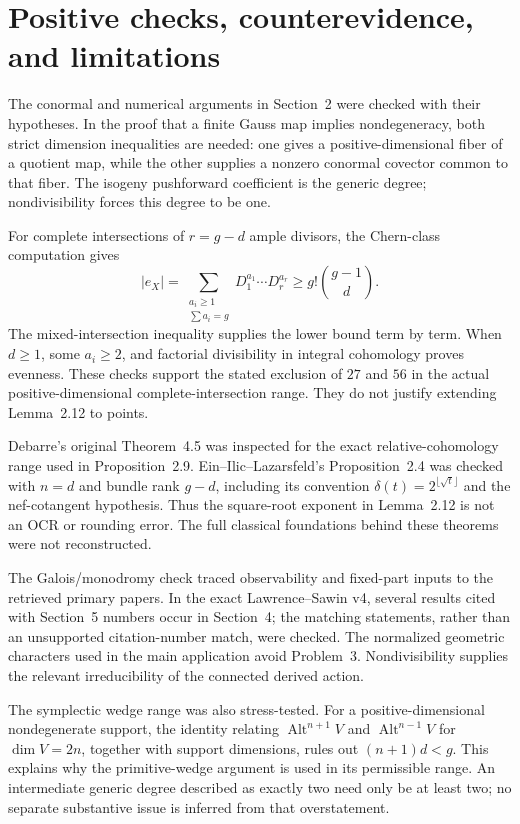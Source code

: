 \documentclass[10pt]{article}
\begin{document}
\section*{Positive checks, counterevidence, and limitations}
The conormal and numerical arguments in Section 2 were checked with their hypotheses. In the proof that a finite Gauss map implies nondegeneracy, both strict dimension inequalities are needed: one gives a positive-dimensional fiber of a quotient map, while the other supplies a nonzero conormal covector common to that fiber. The isogeny pushforward coefficient is the generic degree; nondivisibility forces this degree to be one.\par
For complete intersections of \(r=g-d\) ample divisors, the Chern-class computation gives \[|e_X|=\sum_{\substack{a_i\ge1\\\sum a_i=g}}D_1^{a_1}\cdots D_r^{a_r}
 \ge g!\binom{g-1}{d}.\] The mixed-intersection inequality supplies the lower bound term by term. When \(d\ge1\), some \(a_i\ge2\), and factorial divisibility in integral cohomology proves evenness. These checks support the stated exclusion of \(27\) and \(56\) in the actual positive-dimensional complete-intersection range. They do not justify extending Lemma 2.12 to points.\par
Debarre’s original Theorem 4.5 was inspected for the exact relative-cohomology range used in Proposition 2.9. Ein–Ilic–Lazarsfeld’s Proposition 2.4 was checked with \(n=d\) and bundle rank \(g-d\), including its convention \(\delta(t)=2^{\lfloor\sqrt t\rfloor}\) and the nef-cotangent hypothesis. Thus the square-root exponent in Lemma 2.12 is not an OCR or rounding error. The full classical foundations behind these theorems were not reconstructed.\par
The Galois/monodromy check traced observability and fixed-part inputs to the retrieved primary papers. In the exact Lawrence–Sawin v4, several results cited with Section 5 numbers occur in Section 4; the matching statements, rather than an unsupported citation-number match, were checked. The normalized geometric characters used in the main application avoid Problem 3. Nondivisibility supplies the relevant irreducibility of the connected derived action.\par
The symplectic wedge range was also stress-tested. For a positive-dimensional nondegenerate support, the identity relating \(\operatorname{Alt}^{n+1}V\) and \(\operatorname{Alt}^{n-1}V\) for \(\dim V=2n\), together with support dimensions, rules out \((n+1)d<g\). This explains why the primitive-wedge argument is used in its permissible range. An intermediate generic degree described as exactly two need only be at least two; no separate substantive issue is inferred from that overstatement.\par
\end{document}
